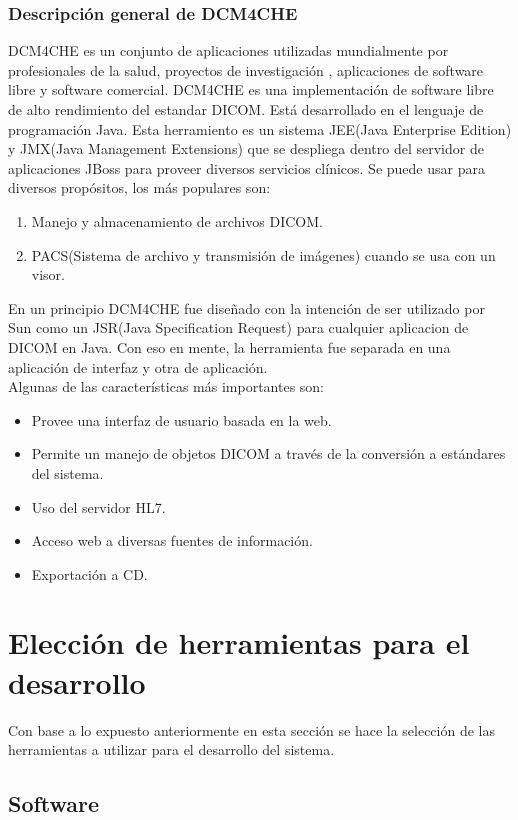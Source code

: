 \documentclass[12pt]{report}
\begin{document}
\subsubsection{Descripción general de DCM4CHE}
DCM4CHE es un conjunto de aplicaciones  utilizadas mundialmente por profesionales de la salud, proyectos de investigación , aplicaciones de software libre y software comercial. DCM4CHE es una implementación de software libre de alto rendimiento del estandar DICOM. Está desarrollado en el lenguaje de programación Java. Esta herramiento es un sistema JEE(Java Enterprise Edition) y JMX(Java Management Extensions) que se despliega dentro del servidor de aplicaciones JBoss para proveer diversos servicios clínicos. Se puede usar para diversos propósitos, los más populares son:
\begin{enumerate}
\item Manejo y almacenamiento de archivos DICOM.
\item PACS(Sistema de archivo y transmisión de imágenes) cuando se usa con un visor.
\end{enumerate}
En un principio DCM4CHE fue diseñado con la intención de ser utilizado por Sun como un JSR(Java Specification Request) para cualquier aplicacion de DICOM en Java. Con eso en mente, la herramienta fue separada en una aplicación de interfaz y otra de aplicación.\cite{dcm}\\

Algunas de las características más importantes son:
\begin{itemize}
\item Provee una interfaz de usuario basada en la web.
\item Permite un manejo de objetos DICOM a través de la conversión a estándares del sistema. 
\item Uso del servidor HL7.
\item Acceso web a diversas fuentes de información. 
\item Exportación a CD.
\end{itemize}

\section{Elección de herramientas para el desarrollo}
Con base a lo expuesto anteriormente en esta sección se hace la selección de las herramientas a utilizar para el desarrollo del sistema.\\
\subsection{Software}
\end{document}
